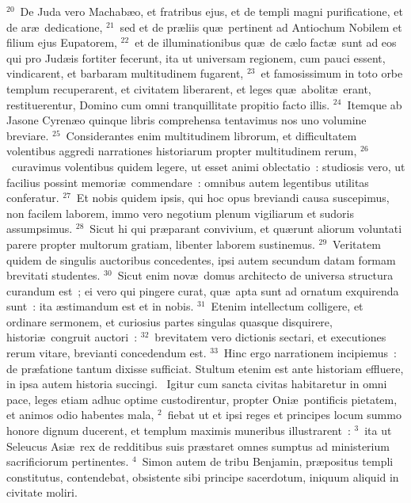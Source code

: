 ${}^{20}$~De Juda vero Machab\ae o, et fratribus ejus, et de templi magni purificatione, et de ar\ae\ dedicatione,
${}^{21}$~sed et de pr\ae liis qu\ae\ pertinent ad Antiochum Nobilem et filium ejus Eupatorem,
${}^{22}$~et de illuminationibus qu\ae\ de c\ae lo fact\ae\ sunt ad eos qui pro Jud\ae is fortiter fecerunt, ita ut universam regionem, cum pauci essent, vindicarent, et barbaram multitudinem fugarent,
${}^{23}$~et famosissimum in toto orbe templum recuperarent, et civitatem liberarent, et leges qu\ae\ abolit\ae\ erant, restituerentur, Domino cum omni tranquillitate propitio facto illis.
${}^{24}$~Itemque ab Jasone Cyren\ae o quinque libris comprehensa tentavimus nos uno volumine breviare.
${}^{25}$~Considerantes enim multitudinem librorum, et difficultatem volentibus aggredi narrationes historiarum propter multitudinem rerum,
${}^{26}$~curavimus volentibus quidem legere, ut esset animi oblectatio~: studiosis vero, ut facilius possint memori\ae\ commendare~: omnibus autem legentibus utilitas conferatur.
${}^{27}$~Et nobis quidem ipsis, qui hoc opus breviandi causa suscepimus, non facilem laborem, immo vero negotium plenum vigiliarum et sudoris assumpsimus.
${}^{28}$~Sicut hi qui pr\ae parant convivium, et qu\ae runt aliorum voluntati parere propter multorum gratiam, libenter laborem sustinemus.
${}^{29}$~Veritatem quidem de singulis auctoribus concedentes, ipsi autem secundum datam formam brevitati studentes.
${}^{30}$~Sicut enim nov\ae\ domus architecto de universa structura curandum est~; ei vero qui pingere curat, qu\ae\ apta sunt ad ornatum exquirenda sunt~: ita \ae stimandum est et in nobis.
${}^{31}$~Etenim intellectum colligere, et ordinare sermonem, et curiosius partes singulas quasque disquirere, histori\ae\ congruit auctori~:
${}^{32}$~brevitatem vero dictionis sectari, et executiones rerum vitare, brevianti concedendum est.
${}^{33}$~Hinc ergo narrationem incipiemus~: de pr\ae fatione tantum dixisse sufficiat. Stultum etenim est ante historiam effluere, in ipsa autem historia succingi.
~\lettrine[lines=10,image=true,loversize=0.05,lraise=-0.03]{I}{}gitur cum sancta civitas habitaretur in omni pace, leges etiam adhuc optime custodirentur, propter Oni\ae\ pontificis pietatem, et animos odio habentes mala,
${}^{2}$~fiebat ut et ipsi reges et principes locum summo honore dignum ducerent, et templum maximis muneribus illustrarent~:
${}^{3}$~ita ut Seleucus Asi\ae\ rex de redditibus suis pr\ae staret omnes sumptus ad ministerium sacrificiorum pertinentes.
${}^{4}$~Simon autem de tribu Benjamin, pr\ae positus templi constitutus, contendebat, obsistente sibi principe sacerdotum, iniquum aliquid in civitate moliri.
